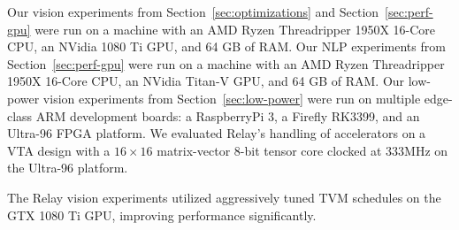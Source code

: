 
  Our vision experiments from Section~\ref{sec:optimizations} and Section~\ref{sec:perf-gpu} were run on a machine with an AMD Ryzen
    Threadripper 1950X 16-Core CPU,
    an NVidia 1080 Ti GPU,
    and 64 GB of RAM.
  Our NLP experiments from Section~\ref{sec:perf-gpu} were run on a machine with an AMD Ryzen
    Threadripper 1950X 16-Core CPU,
    an NVidia Titan-V GPU,
    and 64 GB of RAM.
  Our low-power vision experiments from Section~\ref{sec:low-power} were run on multiple edge-class ARM development boards: a RaspberryPi 3, a Firefly RK3399, and an Ultra-96 FPGA platform.
  We evaluated Relay's handling of accelerators on a VTA design with a
    $16\times16$ matrix-vector 8-bit tensor core clocked at 333MHz on the Ultra-96 platform.


  The Relay vision experiments utilized aggressively tuned TVM schedules on the GTX 1080 Ti GPU,
    improving performance significantly.


